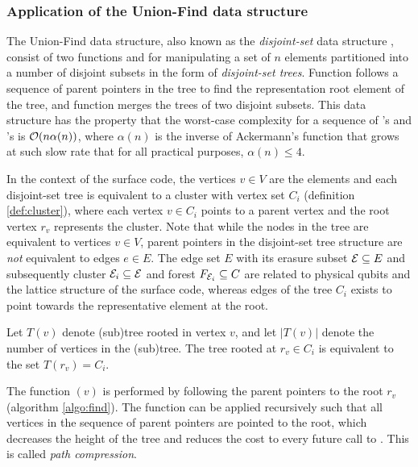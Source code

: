 \subsubsection{Application of the Union-Find data structure}
The Union-Find data structure, also known as the \emph{disjoint-set} data structure \cite{tarjan1975efficiency}, consist of two functions  and  for manipulating a set of $n$ elements partitioned into a number of disjoint subsets in the form of \emph{disjoint-set trees}. Function  follows a sequence of parent pointers in the tree to find the representation root element of the tree, and function  merges the trees of two disjoint subsets. This data structure has the property that the worst-case complexity for a sequence of 's and 's is $\mathcal{O}(n\alpha(n))$, where $\alpha(n)$ is the inverse of Ackermann's function that grows at such slow rate that for all practical purposes, $\alpha(n)\leq 4$. 

In the context of the surface code, the vertices $v\in V$ are the elements and each disjoint-set tree is equivalent to a cluster with vertex set $C_i$ (definition \ref{def:cluster}), where each vertex $v\in C_i$ points to a parent vertex and the root vertex $r_v$ represents the cluster. Note that while the nodes in the tree are equivalent to vertices $v \in V$, parent pointers in the disjoint-set tree structure are \emph{not} equivalent to edges $e\in E$. The edge set $E$ with its erasure subset $\mathcal{E}\subseteq E$ and subsequently cluster $\mathcal{E}_i\subseteq \mathcal{E}$ and forest $F_{\mathcal{E}_i}\subseteq C$ are related to physical qubits and the lattice structure of the surface code, whereas edges of the tree $C_i$ exists to point towards the representative element at the root.
\begin{definition}\label{def:trees}
  Let $T(v)$ denote (sub)tree rooted in vertex $v$, and let $|T(v)|$ denote the number of vertices in the (sub)tree. The tree rooted at $r_v\in C_i$ is equivalent to the set $T(r_v)=C_i$.
\end{definition}

The function $(v)$ is performed by following the parent pointers to the root $r_v$ (algorithm \ref{algo:find}). The function can be applied recursively such that all vertices in the sequence of parent pointers are pointed to the root, which decreases the height of the tree and reduces the cost to every future call to . This is called \emph{path compression}. 
\begin{algorithm}[h]
  \BlankLine
  \BlankLine
  \BlankLine
  \caption{}\label{algo:find}
\end{algorithm}

